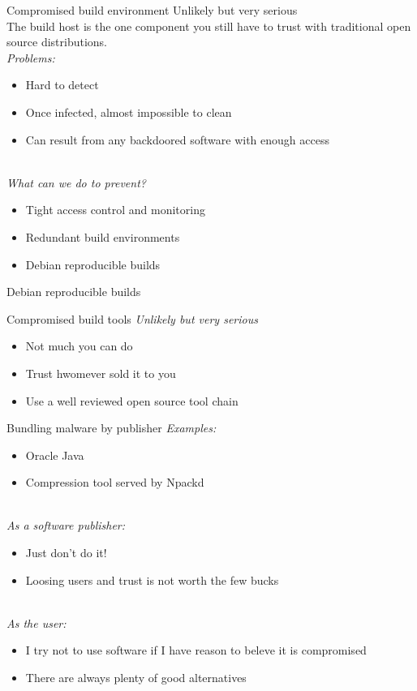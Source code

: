 \documentclass[11pt]{beamer}
\begin{document}
\begin{frame}{Compromised build environment}
Unlikely but very serious\\
The build host is the one component you still have to trust with traditional open source distributions. %
\\[0.2cm]
\emph{Problems:}
\begin{itemize}
\item Hard to detect
\item Once infected, almost impossible to clean
\item Can result from any backdoored software with enough access
\end{itemize}
\\[0.2cm]
\pause
\emph{What can we do to prevent?}
\begin{itemize}
\item Tight access control and monitoring
\item Redundant build environments  %
\item Debian reproducible builds    %
\end{itemize}
\end{frame}

\begin{frame}{Debian reproducible builds}
\end{frame}

\begin{frame}{Compromised build tools}
\emph{Unlikely but very serious}
\\[0.2cm]
\begin{itemize}
\item Not much you can do
\item Trust hwomever sold it to you
\item Use a well reviewed open source tool chain
\end{itemize}
\end{frame}

\begin{frame}{Bundling malware by publisher}
\emph{Examples:}
\begin{itemize}
\item Oracle Java
\item Compression tool served by Npackd %
\end{itemize}
\\[0.2cm]
\pause
\emph{As a software publisher:}
\begin{itemize}
\item Just don't do it!
\item Loosing users and trust is not worth the few bucks
\end{itemize}
\\[0.2cm]
\pause
\emph{As the user:}
\begin{itemize}
\item I try not to use software if I have reason to beleve it is compromised %
\item There are always plenty of good alternatives
\end{itemize}
\end{frame}
\end{document}
